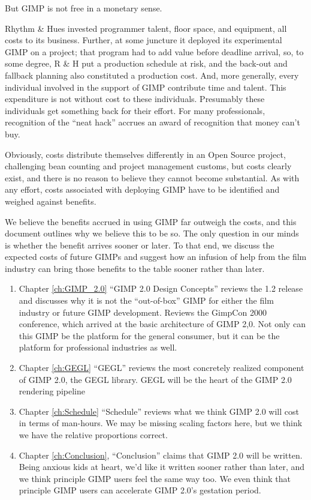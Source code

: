 But GIMP is not free in a monetary sense. 

Rhythm \& Hues invested programmer talent, floor space, and equipment,
all costs to its business. Further, at some juncture it deployed its
experimental GIMP on a project; that program had to add value before
deadline arrival, so, to some degree, R \& H put a production schedule
at risk, and the back-out and fallback planning also constituted a
production cost. And, more generally, every individual involved in the
support of GIMP contribute time and talent. This expenditure is not
without cost to these individuals. Presumably these individuals get
something back for their effort. For many professionals, recognition
of the ``neat hack'' accrues an award of recognition that money can't
buy. 

Obviously, costs distribute themselves differently in an Open Source
project, challenging bean counting and project management customs, but
costs clearly exist, and there is no reason to believe they cannot
become substantial. As with any effort, costs associated with
deploying GIMP have to be identified and weighed against benefits.

We believe the benefits accrued in using GIMP far outweigh the costs,
and this document outlines why we believe this to be so. The only
question in our minds is whether the benefit arrives sooner or
later. To that end, we discuss the expected costs of future GIMPs and
suggest how an infusion of help from the film industry can bring those
benefits to the table sooner rather than later.

\begin{enumerate}

\item Chapter \ref{ch:GIMP_2.0} ``GIMP 2.0 Design Concepts'' reviews the 1.2 
release and discusses why it is not the ``out-of-box'' GIMP for either
the film industry or future GIMP development.  Reviews the GimpCon
2000 conference, which arrived at the basic architecture of GIMP
2,0. Not only can this GIMP be the platform for the general consumer,
but it can be the platform for professional industries as well.

\item Chapter \ref{ch:GEGL} ``GEGL'' reviews the most concretely realized 
component of GIMP 2.0, the GEGL library. GEGL will be the heart of
the GIMP 2.0 rendering pipeline 

\item Chapter \ref{ch:Schedule} ``Schedule'' reviews what we think GIMP 2.0
will cost in terms of man-hours. We may be missing scaling factors
here, but we think we have the relative proportions correct.

\item Chapter \ref{ch:Conclusion}, ``Conclusion'' claims that 
GIMP 2.0 will be written. Being anxious kids at heart, we'd like it
written sooner rather than later, and we think principle GIMP users
feel the same way too. We even think that principle GIMP users
can accelerate GIMP 2.0's gestation period.

\end{enumerate}

